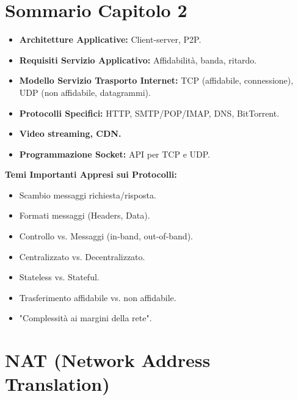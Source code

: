 \section{Sommario Capitolo 2}
\begin{itemize}
    \item \textbf{Architetture Applicative:} Client-server, P2P.
    \item \textbf{Requisiti Servizio Applicativo:} Affidabilità, banda, ritardo.
    \item \textbf{Modello Servizio Trasporto Internet:} TCP (affidabile, connessione), UDP (non affidabile, datagrammi).
    \item \textbf{Protocolli Specifici:} HTTP, SMTP/POP/IMAP, DNS, BitTorrent.
    \item \textbf{Video streaming, CDN.}
    \item \textbf{Programmazione Socket:} API per TCP e UDP.
\end{itemize}
\textbf{Temi Importanti Appresi sui Protocolli:}
\begin{itemize}
    \item Scambio messaggi richiesta/risposta.
    \item Formati messaggi (Headers, Data).
    \item Controllo vs. Messaggi (in-band, out-of-band).
    \item Centralizzato vs. Decentralizzato.
    \item Stateless vs. Stateful.
    \item Trasferimento affidabile vs. non affidabile.
    \item "Complessità ai margini della rete".
\end{itemize}

\appendix
\section{NAT (Network Address Translation)}
